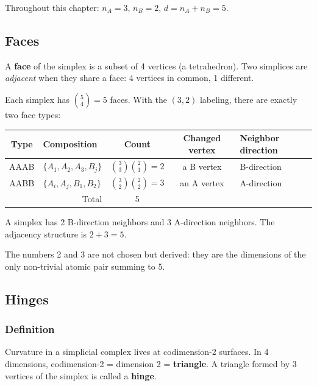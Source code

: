 \begin{definition}[Notation]
Throughout this chapter: $n_A = 3$, $n_B = 2$, $d = n_A + n_B = 5$.
\end{definition}

\subsection{Faces}

A \textbf{face} of the simplex is a subset of 4 vertices (a tetrahedron). Two simplices are \emph{adjacent} when they share a face: 4 vertices in common, 1 different.

Each simplex has $\binom{5}{4} = 5$ faces. With the $(3,2)$ labeling, there are exactly two face types:

\begin{center}
\begin{tabular}{clccl}
\hline
Type & Composition & Count & Changed vertex & Neighbor direction \\
\hline
AAAB & $\{A_1, A_2, A_3, B_j\}$ & $\binom{3}{3}\binom{2}{1} = 2$ & a B vertex & B-direction \\
AABB & $\{A_i, A_j, B_1, B_2\}$ & $\binom{3}{2}\binom{2}{2} = 3$ & an A vertex & A-direction \\
\hline
\multicolumn{2}{r}{Total} & 5 & & \\
\hline
\end{tabular}
\end{center}

\begin{theorem}
A simplex has 2 B-direction neighbors and 3 A-direction neighbors. The adjacency structure is $2 + 3 = 5$.
\end{theorem}

\begin{remark}
The numbers 2 and 3 are not chosen but derived: they are the dimensions of the only non-trivial atomic pair summing to 5.
\end{remark}

\subsection{Hinges}

\subsubsection{Definition}

Curvature in a simplicial complex lives at codimension-2 surfaces. In 4 dimensions, codimension-2 = dimension 2 = \textbf{triangle}. A triangle formed by 3 vertices of the simplex is called a \textbf{hinge}.

